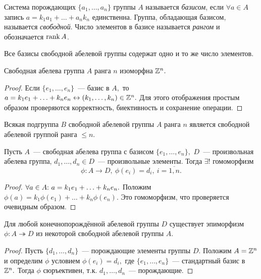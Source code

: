        \begin{definition}
            Система порождающих ${\{a_1,\ldots,a_n\}}$ группы $A$ называется \textit{базисом}, если ${\forall a \in A}$ запись ${a = k_1a_1+\ldots+a_nk_n}$ единственна. Группа, обладающая базисом, называется \textit{свободной}. Число элементов в базисе называется \textit{рангом} и обозначается $\mathrm{rank} \, A$.
        \end{definition}
        \begin{statement}
            Все базисы свободной абелевой группы содержат одно и то же число элементов.
        \end{statement}
        \newpage
        \begin{lemma}
            Свободная абелева группа $A$ ранга $n$ изоморфна $\mathbb{Z}^n.$
        \end{lemma}
        \begin{proof}
            Если ${\{e_1,\ldots,e_n\}}$~--- базис в $A,$ то ${a = k_1e_1+\ldots+k_ne_n \leftrightarrow (k_1,\ldots,k_n) \in \mathbb{Z}^n.}$ Для этого отображения простым образом проверяются корректность, биективность и сохранение операции.
        \end{proof}
        \begin{theorem}
            Всякая подгруппа $B$ свободной абелевой группы $A$ ранга $n$ является свободной абелевой группой ранга $\leqslant n$. 
        \end{theorem}
        \begin{statement}
            Пусть $A$~--- свободная абелева группа с базисом ${\{e_1,\ldots,e_n\},}$ $D$~--- произвольная абелева группа, ${d_1,\ldots,d_n \in D}$~--- произвольные элементы. Тогда $\exists!$ гомоморфизм 
            \begin{equation*}
                \phi : A \rightarrow D, \ \phi(e_i) = d_i, \ i = \overline{1,n}.
            \end{equation*}
        \end{statement}
        \begin{proof}
            ${\forall a \in A{:}{ } \  a = k_1e_1+\ldots+k_ne_n.}$\newline
            Положим ${\phi(a) = k_1\phi(e_1)+\ldots+k_n\phi(e_n).}$ Это гомоморфизм, что проверяется очевидным образом.
        \end{proof}
        \begin{consequence*}
            Для любой конечнопорождённой абелевой группы $D$ существует эпиморфизм ${\phi : A \twoheadrightarrow D}$ из некоторой свободной абелевой группы $A$. 
        \end{consequence*}
        \begin{proof}
            Пусть ${\{d_1,\ldots,d_n\}}$~--- порождающие элементы группы $D.$ Положим ${A = \mathbb{Z}^n}$ и определим $\phi$ условием ${\phi(e_i) = d_i,}$ где ${\{e_1,\ldots,e_n\}}$~--- стандартный базис в $\mathbb{Z}^n.$ Тогда $\phi$ сюръективен, т.к. ${d_1,\ldots,d_n}$~--- порождающие.
        \end{proof}